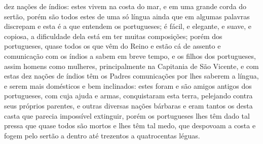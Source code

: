 \begin{linenumbers}
dez nações de índios: estes vivem na costa do mar, e em uma grande
corda do sertão, porém são todos estes de uma só língua ainda que em
algumas palavras discrepam e esta é a que entendem os portugueses; é
fácil, e elegante, e suave, e copiosa, a dificuldade dela está em ter
muitas composições; porém dos portugueses, quase todos os que vêm do
Reino e estão cá de assento e comunicação com os índios a sabem em
breve tempo, e os filhos dos portugueses, assim homens como mulheres,
principalmente na Capitania de São Vicente, e com estas dez nações de
índios têm os Padres comunicações por lhes saberem a língua, e serem
mais domésticos e bem inclinados: estes foram e são amigos antigos dos
portugueses, com cuja ajuda e armas, conquistaram esta terra, pelejando
contra seus próprios parentes, e outras diversas nações bárbaras e eram
tantos os desta casta que parecia impossível extinguir, porém os
portugueses lhes têm dado tal pressa que quase todos são mortos e lhes
têm tal medo, que despovoam a costa e fogem pelo sertão a dentro até
trezentos a quatrocentas léguas.


\end{linenumbers}

